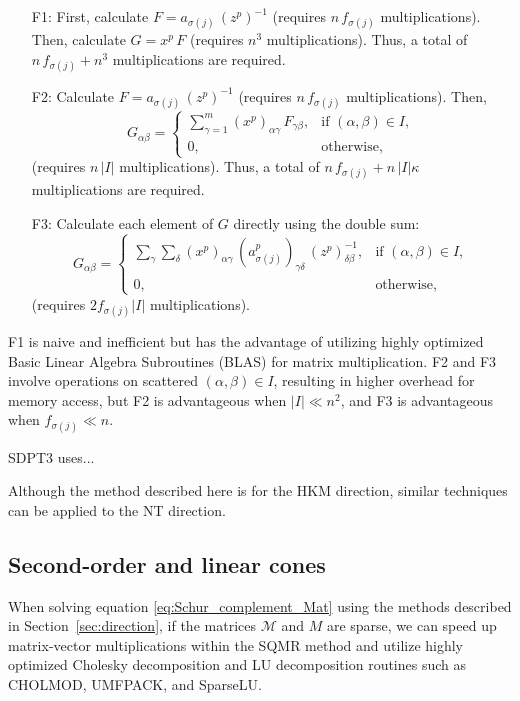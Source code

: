 \begin{enumerate}
\item[F1:] First, calculate $F=a_{\sigma(j)}\,(z^p)^{-1}$ (requires $n\,f_{\sigma(j)}$ multiplications).
           Then, calculate $G=x^p\,F$ (requires $n^3$ multiplications).
           Thus, a total of $n\,f_{\sigma(j)} + n^3$ multiplications are required.
\item[F2:] Calculate $F=a_{\sigma(j)}\,(z^p)^{-1}$ (requires $n\,f_{\sigma(j)}$ multiplications). Then,
  \[
    G_{\alpha\beta}=
    \begin{cases}
     \sum_{\gamma=1}^m (x^p)_{\alpha\gamma}\,F_{\gamma\beta}, & \text{if } (\alpha,\beta)\in I,\\
     0, & \text{otherwise},
    \end{cases}
  \]
  (requires $n\,|I|$ multiplications).  
  Thus, a total of $n\,f_{\sigma(j)} + n\,|I|\kappa$ multiplications are required.
\item[F3:] Calculate each element of $G$ directly using the double sum:
  \[
    G_{\alpha\beta}=
    \begin{cases}
      \sum_{\gamma}\sum_{\delta}
        (x^p)_{\alpha\gamma}\,(a^p_{\sigma(j)})_{\gamma\delta}\,(z^p)^{-1}_{\delta\beta},
       & \text{if } (\alpha,\beta) \in I,\\
      0, & \text{otherwise},
    \end{cases}
  \]
  (requires $2f_{\sigma(j)}|I|$ multiplications).
\end{enumerate}

\noindent
F1 is naive and inefficient but has the advantage of utilizing highly optimized Basic Linear Algebra Subroutines (BLAS) for matrix multiplication.
F2 and F3 involve operations on scattered $(\alpha,\beta) \in I$, resulting in higher overhead for memory access, but F2 is advantageous when $|I| \ll n^2$, and F3 is advantageous when $f_{\sigma(j)} \ll n$.

SDPT3 uses...

\medskip

Although the method described here is for the HKM direction, similar techniques can be applied to the NT direction.

\subsection{Second-order and linear cones} \label{sec:exploit_sparsity_socp_lp}
When solving equation \eqref{eq:Schur_complement_Mat} using the methods described in Section~\ref{sec:direction},
if the matrices $\mathcal{M}$ and $M$ are sparse, we can speed up matrix-vector multiplications within the SQMR method and utilize highly optimized Cholesky decomposition and LU decomposition routines such as CHOLMOD, UMFPACK, and SparseLU.

